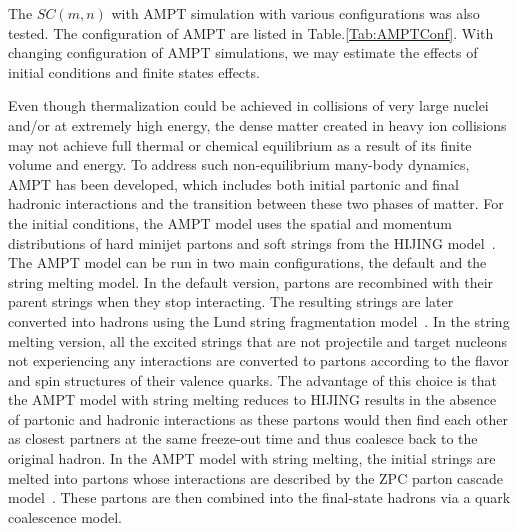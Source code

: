 The $SC(m,n)$ with AMPT \cite{Zhang:1999bd,Lin:2000cx,Lin:2004en} simulation with various configurations was also tested. The configuration of AMPT are listed in Table.\ref{Tab:AMPTConf}. With changing configuration of AMPT simulations, we may estimate the effects of initial conditions and finite states effects. 

Even though thermalization could be achieved in collisions of very large nuclei and/or at extremely high energy, the dense matter created in heavy ion collisions may not achieve full thermal or chemical equilibrium as a result of its finite volume and energy. To address such non-equilibrium many-body dynamics, AMPT has been developed, which includes both initial partonic and final hadronic interactions and the transition between these two phases of matter.
For the initial conditions, the AMPT model uses the spatial and momentum distributions of hard minijet partons and soft strings from the HIJING model~\cite{Wang:1991hta,Gyulassy:1994ew}.
The AMPT model can be run in two main configurations, the default and the string melting model.
In the default version, partons are recombined with their parent strings when they stop interacting. The resulting strings are later converted into hadrons using the Lund string fragmentation model~\cite{Andersson:1986gw,NilssonAlmqvist:1986rx}. In the string melting version,  all the excited strings that are not projectile and target nucleons not experiencing any interactions are converted to partons according to the flavor and spin structures of their valence quarks. The advantage of this choice is that the AMPT model with string melting reduces to HIJING results in the absence of partonic and hadronic interactions as these partons would then find each other as closest partners at the same freeze-out time and thus coalesce back to the original hadron. In the AMPT model with string melting, the initial strings are melted into partons whose interactions are described by the ZPC parton cascade model~\cite{Zhang:1997ej}. These partons are then combined into the final-state hadrons via a quark coalescence model.  \cite{Lin:2005br}

